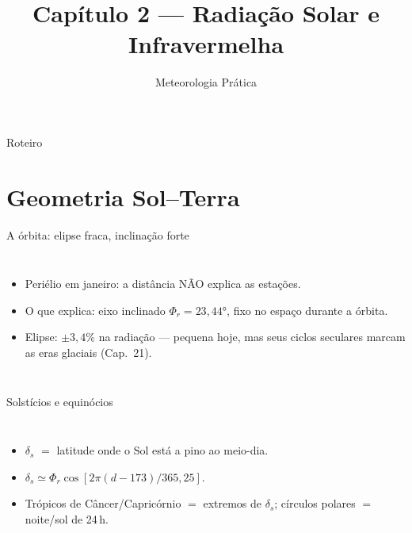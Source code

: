 \documentclass[aspectratio=169,11pt]{beamer}
\title[Cap. 2 --- Radiação]{Capítulo 2 --- Radiação Solar e Infravermelha}
\subtitle{Meteorologia Prática}
\author{}
\date{}
\begin{document}
\begin{frame}
  \titlepage
  \vfill
  \atribuicao
\end{frame}

\begin{frame}{Roteiro}
  \tableofcontents
\end{frame}

\section{Geometria Sol--Terra}

\begin{frame}{A órbita: elipse fraca, inclinação forte}
  \begin{columns}
    \begin{itemize}
      \item Periélio em \alert{janeiro}: a distância NÃO explica as
            estações.
      \item O que explica: eixo inclinado $\Phi_r = 23{,}44°$, fixo no
            espaço durante a órbita.
      \item Elipse: $\pm3{,}4\%$ na radiação — pequena hoje, mas seus
            ciclos seculares marcam as eras glaciais (Cap.~21).
    \end{itemize}
  \end{columns}
\end{frame}

\begin{frame}{Solstícios e equinócios}
  \begin{columns}
    \begin{itemize}
      \item $\delta_s$ $=$ latitude onde o Sol está a pino ao meio-dia.
      \item $\delta_s \simeq \Phi_r\cos[2\pi(d-173)/365{,}25]$.
      \item Trópicos de Câncer/Capricórnio $=$ extremos de $\delta_s$;
            círculos polares $=$ noite/sol de 24\,h.
    \end{itemize}
  \end{columns}
\end{frame}
\end{document}
